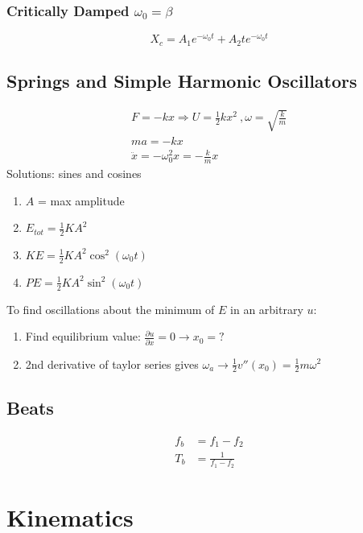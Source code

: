 \documentclass[10pt,letter]{article}
\begin{document}
\subsubsection{Critically Damped $\omega_0 = \beta$}
\begin{equation}
 X_c = A_1 e^{-\omega_0 t} + A_2t e^{-\omega_0 t} 
\end{equation}

\subsection{Springs and Simple Harmonic Oscillators}
\begin{align}
 F=-kx \Rightarrow U = \frac{1}{2}kx^2~, \omega=\sqrt{\frac{k}{m}}\\
 ma = -kx\\
 \ddot{x} = -\omega_0^2 x = -\frac{k}{m}x
\end{align}
Solutions: sines and cosines
\begin{enumerate}
 \item $A$ = max amplitude
 \item $E_{tot} = \frac{1}{2}KA^2$
 \item $KE = \frac{1}{2}KA^2 \cos^2(\omega_0t)$
 \item $PE = \frac{1}{2}KA^2 \sin^2(\omega_0t)$
\end{enumerate}
To find oscillations about the minimum of $E$ in an arbitrary $u$:
\begin{enumerate}
    \item Find equilibrium value: $\frac{\partial u}{\partial x} = 0 \rightarrow x_0 = ?$
    \item 2nd derivative of taylor series gives $\omega_a \rightarrow \frac{1}{2} v'' (x_0) = \frac{1}{2}m\omega^2$
\end{enumerate}

\subsection{Beats}
\begin{align}
 f_b &= f_1 - f_2\\
 T_b &= \frac{1}{f_1 - f_2}
\end{align}


\section{Kinematics}
\end{document}
